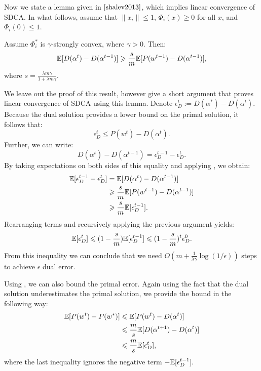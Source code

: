 Now we state a lemma given in $\cite{shalev2013}$, which implies linear convergence of SDCA. In what follows, assume that $\|x_i\|\leq 1$, $\Phi_i(x)\geq 0$ for all $x$, and $\Phi_i(0)\leq 1$.

\begin{lemma}
Assume $\Phi_i^*$ is $\gamma$-strongly convex, where $\gamma>0$. Then:
$$\mathbb{E}[D(\alpha^t)-D(\alpha^{t-1})]\geqslant\frac{s}{m}\mathbb{E}[P(w^{t-1})-D(\alpha^{t-1})],$$
where $s=\frac{\lambda m\gamma}{1 + \lambda m \gamma}$.
\end{lemma}
We leave out the proof of this result, however give a short argument that proves linear convergence of SDCA using this lemma. Denote $\epsilon_D^t:=D(\alpha^*) - D(\alpha^t)$. Because the dual solution provides a lower bound on the primal solution, it follows that:
$$\epsilon_D^t \leq P(w^t) - D(\alpha^t).$$
Further, we can write:
$$D(\alpha^t)-D(\alpha^{t-1}) = \epsilon_D^{t-1}-\epsilon_D^t.$$
By taking expectations on both sides of this equality and applying , we obtain:
\begin{align*}
\mathbb{E}[\epsilon_D^{t-1}-\epsilon_D^t]&=\mathbb{E}[D(\alpha^t)-D(\alpha^{t-1})]\\
&\geqslant\frac{s}{m}\mathbb{E}[P(w^{t-1}) - D(\alpha^{t-1})]\\
&\geqslant\frac{s}{m}\mathbb{E}[\epsilon_D^{t-1}].
\end{align*}
Rearranging terms and recursively applying the previous argument yields:
$$\mathbb{E}[\epsilon_D^t]\leqslant (1-\frac{s}{m})\mathbb{E}[\epsilon_D^{t-1}]\leqslant (1-\frac{s}{m})^t\epsilon_D^0.$$
From this inequality we can conclude that we need $O(m+\frac{1}{\lambda\gamma}\log(1/\epsilon))$ steps to achieve $\epsilon$ dual error.

Using , we can also bound the primal error. Again using the fact that the dual solution underestimates the primal solution, we provide the bound in the following way:
\begin{align*}
    \mathbb{E}[P(w^t)-P(w^*)]&\leqslant \mathbb{E}[P(w^t)-D(\alpha^t)]\\
    &\leqslant\frac{m}{s}\mathbb{E}[D(\alpha^{t+1})-D(\alpha^t)]\\
    &\leqslant\frac{m}{s}\mathbb{E}[\epsilon_D^t],
\end{align*}
where the last inequality ignores the negative term $-\mathbb{E}[\epsilon_D^{t-1}].$
